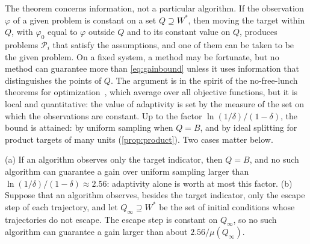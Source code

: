 The theorem concerns information, not a particular algorithm. If the observation $\varphi$ of a given problem is constant on a set $Q\supseteq W^*$, then moving the target within $Q$, with $\varphi_0$ equal to $\varphi$ outside $Q$ and to its constant value on $Q$, produces problems $\mathcal P_i$ that satisfy the assumptions, and one of them can be taken to be the given problem. On a fixed system, a method may be fortunate, but no method can guarantee more than \eqref{eq:gainbound} unless it uses information that distinguishes the points of $Q$. The argument is in the spirit of the no-free-lunch theorems for optimization~\cite{WolpertMacready1997}, which average over all objective functions, but it is local and quantitative: the value of adaptivity is set by the measure of the set on which the observations are constant. Up to the factor $\ln(1/\delta)/(1-\delta)$, the bound is attained: by uniform sampling when $Q=B$, and by ideal splitting for product targets of many units (\cref{prop:product}). Two cases matter below.

\begin{corollary}\label{cor:channels}
\textup{(a)} If an algorithm observes only the target indicator, then $Q=B$, and no such algorithm can guarantee a gain over uniform sampling larger than $\ln(1/\delta)/(1-\delta)\approx2.56$: adaptivity alone is worth at most this factor.
\textup{(b)} Suppose that an algorithm observes, besides the target indicator, only the escape step of each trajectory, and let $Q_\infty\supseteq W^*$ be the set of initial conditions whose trajectories do not escape. The escape step is constant on $Q_\infty$, so no such algorithm can guarantee a gain larger than about $2.56/\mu(Q_\infty)$.
\end{corollary}

